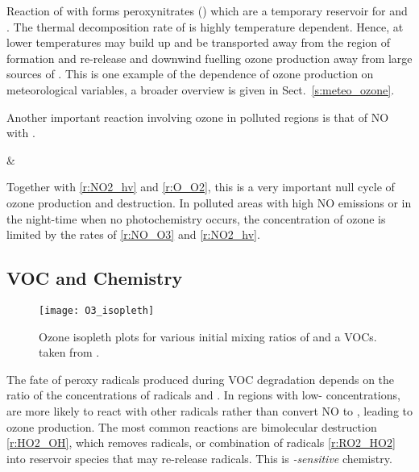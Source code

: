 Reaction of  with  forms peroxynitrates () which are a temporary reservoir for  and .
The thermal decomposition rate of  is highly temperature dependent.
Hence, at lower temperatures  may build up and be transported away from the region of formation and re-release  and  downwind fuelling ozone production away from large sources of .
This is one example of the dependence of ozone production on meteorological variables, a broader overview is given in Sect.~\ref{s:meteo_ozone}.


Another important reaction involving ozone in polluted regions is that of NO with .
\begin{rxnarray}
     & \rightarrow {} \label{r:NO_O3}
\end{rxnarray}
Together with \eqref{r:NO2_hv} and \eqref{r:O_O2}, this is a very important null cycle of ozone production and destruction.
In polluted areas with high NO emissions or in the night-time when no photochemistry occurs, the concentration of ozone is limited by the rates of \eqref{r:NO_O3} and \eqref{r:NO2_hv}.


\subsection[VOC and NOx Chemistry]{VOC and  Chemistry} \label{ss:VOC&NOx}
\begin{figure}
	\begin{center}
        \caption[Ozone mixing ratios as a function of  and VOC]{Ozone isopleth plots for various initial mixing ratios of  and a VOCs. taken from \citet{Jenkin:2000}.}
        \texttt{[image: O3\_isopleth]}
		\label{f:O3_isopleth}
	\end{center}
\end{figure}
The fate of peroxy radicals produced during VOC degradation depends on the ratio of the concentrations of radicals and  \citep{Kleinman:1991, Kleinman:1994}.
In regions with low- concentrations,  are more likely to react with other radicals rather than convert NO to , leading to ozone production.
The most common reactions are bimolecular destruction \eqref{r:HO2_OH}, which removes radicals, or combination of radicals \eqref{r:RO2_HO2} into reservoir species that may re-release radicals.
This is \emph{-sensitive} chemistry.

